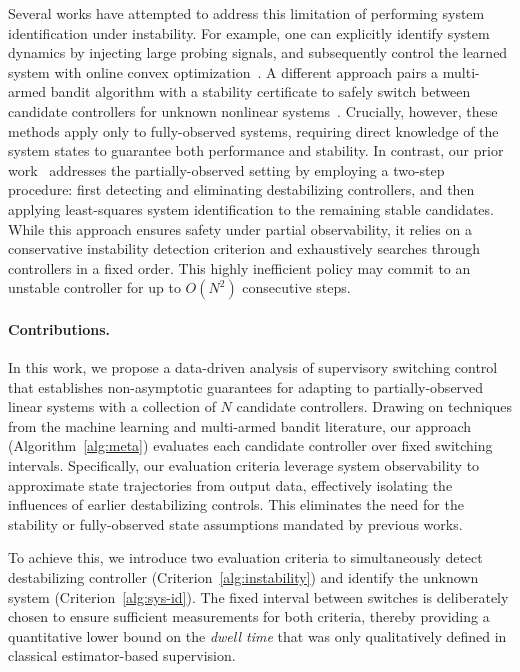 \documentclass[11pt, twoside]{article}
\newcounter{criteria}
\theoremstyle{definition}
\begin{document}
Several works have attempted to address this limitation of performing system identification under instability.
For example, one can explicitly identify system dynamics by injecting large probing signals, and subsequently control the learned system with online convex optimization~\cite{chen2021black}.
A different approach pairs a multi-armed bandit algorithm with a stability certificate to safely switch between candidate controllers for unknown nonlinear systems~\cite{li2023online,kim2025online}.
Crucially, however, these methods apply only to fully-observed systems, requiring direct knowledge of the system states to guarantee both performance and stability.
In contrast, our prior work~\citep{sun2024least} addresses the partially-observed setting by employing a two-step procedure: first detecting and eliminating destabilizing controllers, and then applying least-squares system identification to the remaining stable candidates.
While this approach ensures safety under partial observability, it relies on a conservative instability detection criterion and exhaustively searches through controllers in a fixed order.
This highly inefficient policy may commit to an unstable controller for up to $O(N^2)$ consecutive steps.


\paragraph{Contributions.}
In this work, we propose a data-driven analysis of supervisory switching control that establishes non-asymptotic guarantees for adapting to partially-observed linear systems with a collection of $N$ candidate controllers. 
Drawing on techniques from the machine learning and multi-armed bandit literature, our approach (Algorithm~\ref{alg:meta}) evaluates each candidate controller over fixed switching intervals.
Specifically, our evaluation criteria leverage system observability to approximate state trajectories from output data, effectively isolating the influences of earlier destabilizing controls.
This eliminates the need for the stability or fully-observed state assumptions mandated by previous works.

To achieve this, we introduce two evaluation criteria to simultaneously detect destabilizing controller (Criterion~\ref{alg:instability}) and identify the unknown system (Criterion~\ref{alg:sys-id}).
The fixed interval between switches is deliberately chosen to ensure sufficient measurements for both criteria, thereby providing a quantitative lower bound on the \textit{dwell time} that was only qualitatively defined in classical estimator-based supervision.
\end{document}
